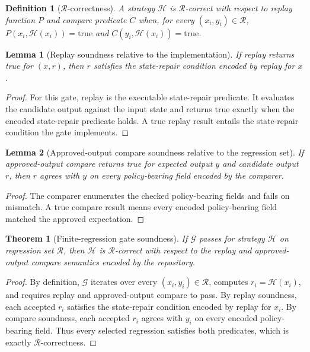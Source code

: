 \documentclass[11pt]{article}
\newtheorem{definition}{Definition}
\newtheorem{lemma}{Lemma}
\newtheorem{theorem}{Theorem}
\newcommand{\regression}{\mathcal{R}}
\newcommand{\gate}{\mathcal{G}}
\newcommand{\strategy}{\mathcal{H}}
\begin{document}
\begin{definition}[$\regression$-correctness]
A strategy $\strategy$ is $\regression$-correct with respect to replay function $P$ and compare
predicate $C$ when, for every $(x_i, y_i) \in \regression$,
$P(x_i, \strategy(x_i)) = \mathrm{true}$ and
$C(y_i, \strategy(x_i)) = \mathrm{true}$.
\end{definition}

\begin{lemma}[Replay soundness relative to the implementation]
If replay returns true for $(x, r)$, then $r$ satisfies the state-repair condition encoded by
replay for $x$.
\end{lemma}

\begin{proof}
For this gate, replay is the executable state-repair predicate.  It evaluates the candidate
output against the input state and returns true exactly when the encoded state-repair
predicate holds.  A true replay result entails the state-repair condition the gate implements.
\end{proof}

\begin{lemma}[Approved-output compare soundness relative to the regression set]
If approved-output compare returns true for expected output $y$ and candidate output $r$, then $r$
agrees with $y$ on every policy-bearing field encoded by the comparer.
\end{lemma}

\begin{proof}
The comparer enumerates the checked policy-bearing fields and fails on mismatch.  A true
compare result means every encoded policy-bearing field matched the approved expectation.
\end{proof}

\begin{theorem}[Finite-regression gate soundness]
If $\gate$ passes for strategy $\strategy$ on regression set $\regression$, then $\strategy$ is
$\regression$-correct with respect to the replay and approved-output compare semantics encoded by the
repository.
\end{theorem}

\begin{proof}
By definition, $\gate$ iterates over every $(x_i, y_i) \in \regression$, computes
$r_i = \strategy(x_i)$, and requires replay and approved-output compare to pass.  By replay soundness, each
accepted $r_i$ satisfies the state-repair condition encoded by replay for $x_i$.  By compare
soundness, each accepted $r_i$ agrees with $y_i$ on every encoded policy-bearing field.
Thus every selected regression satisfies both predicates, which is exactly
$\regression$-correctness.
\end{proof}
\end{document}

